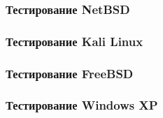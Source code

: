 \documentclass[9pt, compress]{beamer}
\begin{document}
\begin{frame}[fragile]
\frametitle{Тестирование NetBSD}
\begin{center}  
\end{center}
\end{frame}

\begin{frame}[fragile]
\frametitle{Тестирование Kali Linux}
\begin{center}  
\end{center}
\end{frame}

\begin{frame}[fragile]
\frametitle{Тестирование FreeBSD}
\begin{center}  
\end{center}
\end{frame}

\begin{frame}[fragile]
\frametitle{Тестирование Windows XP}
\begin{center}  
\end{center}
\end{frame}
\end{document}
